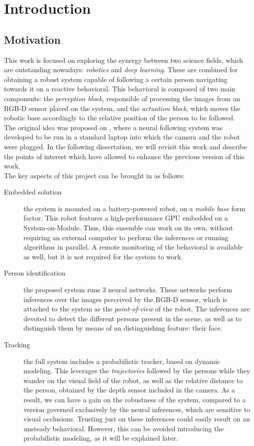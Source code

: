 \chapter{Introduction}
\section{Motivation}
	This work is focused on exploring the synergy between two science fields, which are outstanding nowadays: \textit{robotics} and \textit{deep learning}. These are combined for obtaining a robust system capable of following a certain person navigating towards it on a reactive behavioral. This behavioral is composed of two main components: the \textit{perception block}, responsible of processing the images from an RGB-D sensor placed on the system, and the \textit{actuation block}, which moves the robotic base accordingly to the relative position of the person to be followed.\\
	
	The original idea was proposed on \cite{tfg}, where a neural following system was developed to be run in a standard laptop into which the camera and the robot were plugged. In the following dissertation, we will revisit this work and describe the points of interest which have allowed to enhance the previous version of this work.\\
	
	The key aspects of this project can be brought in as follows:
	\begin{description}
		\item[Embedded solution] the system is mounted on a battery-powered robot, on a \textit{mobile base} form factor. This robot features a high-performance GPU embedded on a System-on-Module. Thus, this ensemble can work on its own, without requiring an external computer to perform the inferences or running algorithms in parallel. A remote monitoring of the behavioral is available as well, but it is not required for the system to work.

		\item[Person identification] the proposed system runs 3 neural networks. These networks perform inferences over the images perceived by the RGB-D sensor, which is attached to the system as the \textit{point-of-view} of the robot. The inferences are devoted to detect the different persons present in the scene, as well as to distinguish them by means of an distinguishing feature: their face.

		\item[Tracking] the full system includes a probabilistic tracker, based on dynamic modeling. This leverages the \textit{trajectories} followed by the persons while they wander on the visual field of the robot, as well as the relative distance to the person, obtained by the depth sensor included in the camera. As a result, we can have a gain on the robustness of the system, compared to a version governed exclusively by the neural inferences, which are sensitive to visual occlusions. Trusting just on these inferences could easily result on an unsteady behavioral. However, this can be avoided introducing the probabilistic modeling, as it will be explained later.
	\end{description}
	

